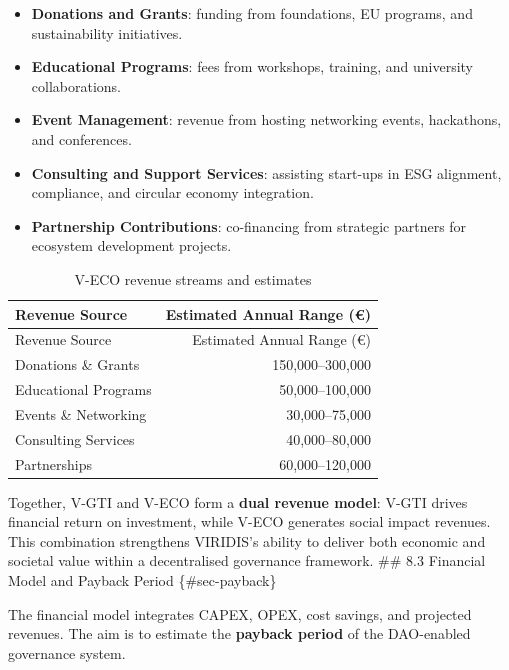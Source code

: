 \documentclass[
  english,
  12pt,
  oneside,
  open=any]{scrbook}
\providecommand{\tightlist}{%
  \setlength{\itemsep}{0pt}\setlength{\parskip}{0pt}}\usepackage{longtable,booktabs,array}
\begin{document}
\begin{itemize}
\tightlist
\item
  \textbf{Donations and Grants}: funding from foundations, EU programs,
  and sustainability initiatives.\\
\item
  \textbf{Educational Programs}: fees from workshops, training, and
  university collaborations.\\
\item
  \textbf{Event Management}: revenue from hosting networking events,
  hackathons, and conferences.\\
\item
  \textbf{Consulting and Support Services}: assisting start-ups in ESG
  alignment, compliance, and circular economy integration.\\
\item
  \textbf{Partnership Contributions}: co-financing from strategic
  partners for ecosystem development projects.
\end{itemize}

\begin{longtable}[]{@{}lr@{}}
\caption{V-ECO revenue streams and
estimates}\label{tbl-veco-revenue}\tabularnewline
\toprule\noalign{}
Revenue Source & Estimated Annual Range (€) \\
\midrule\noalign{}
\endfirsthead
\toprule\noalign{}
Revenue Source & Estimated Annual Range (€) \\
\midrule\noalign{}
\endhead
\bottomrule\noalign{}
\endlastfoot
Donations \& Grants & 150,000--300,000 \\
Educational Programs & 50,000--100,000 \\
Events \& Networking & 30,000--75,000 \\
Consulting Services & 40,000--80,000 \\
Partnerships & 60,000--120,000 \\
\end{longtable}

Together, V-GTI and V-ECO form a \textbf{dual revenue model}: V-GTI
drives financial return on investment, while V-ECO generates social
impact revenues. This combination strengthens VIRIDIS's ability to
deliver both economic and societal value within a decentralised
governance framework. \#\# 8.3 Financial Model and Payback Period
\{\#sec-payback\}

The financial model integrates CAPEX, OPEX, cost savings, and projected
revenues. The aim is to estimate the \textbf{payback period} of the
DAO-enabled governance system.
\end{document}
